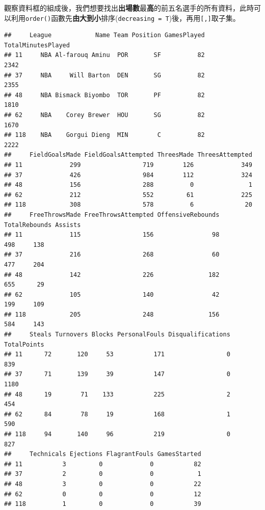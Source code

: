 \documentclass[]{book}
\newenvironment{Shaded}{\begin{snugshade}}{\end{snugshade}}
\newcommand{\KeywordTok}[1]{\textcolor[rgb]{0.13,0.29,0.53}{\textbf{{#1}}}}
\newcommand{\DataTypeTok}[1]{\textcolor[rgb]{0.13,0.29,0.53}{{#1}}}
\newcommand{\DecValTok}[1]{\textcolor[rgb]{0.00,0.00,0.81}{{#1}}}
\newcommand{\NormalTok}[1]{{#1}}
\theoremstyle{definition}
\theoremstyle{definition}
\theoremstyle{remark}
\begin{document}
觀察資料框的組成後，我們想要找出\textbf{出場數}最\textbf{高}的前五名選手的所有資料，此時可以利用\texttt{order()}函數先\textbf{由大到小}排序(\texttt{decreasing\ =\ T})後，再用\texttt{{[},{]}}取子集。

\begin{Shaded}
\end{Shaded}

\begin{verbatim}
##     League            Name Team Position GamesPlayed TotalMinutesPlayed
## 11     NBA Al-farouq Aminu  POR       SF          82               2342
## 37     NBA     Will Barton  DEN       SG          82               2355
## 48     NBA Bismack Biyombo  TOR       PF          82               1810
## 62     NBA    Corey Brewer  HOU       SG          82               1670
## 118    NBA    Gorgui Dieng  MIN        C          82               2222
##     FieldGoalsMade FieldGoalsAttempted ThreesMade ThreesAttempted
## 11             299                 719        126             349
## 37             426                 984        112             324
## 48             156                 288          0               1
## 62             212                 552         61             225
## 118            308                 578          6              20
##     FreeThrowsMade FreeThrowsAttempted OffensiveRebounds TotalRebounds Assists
## 11             115                 156                98           498     138
## 37             216                 268                60           477     204
## 48             142                 226               182           655      29
## 62             105                 140                42           199     109
## 118            205                 248               156           584     143
##     Steals Turnovers Blocks PersonalFouls Disqualifications TotalPoints
## 11      72       120     53           171                 0         839
## 37      71       139     39           147                 0        1180
## 48      19        71    133           225                 2         454
## 62      84        78     19           168                 1         590
## 118     94       140     96           219                 0         827
##     Technicals Ejections FlagrantFouls GamesStarted
## 11           3         0             0           82
## 37           2         0             0            1
## 48           3         0             0           22
## 62           0         0             0           12
## 118          1         0             0           39
\end{verbatim}
\end{document}
